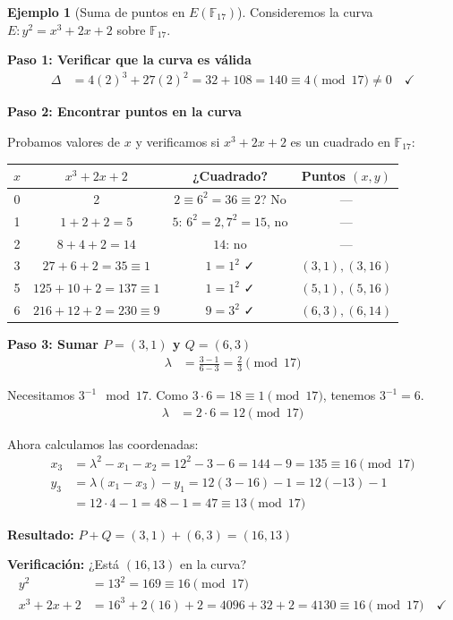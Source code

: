 \documentclass[11pt,a4paper,twoside,openright]{book}
\theoremstyle{definition}
\newtheorem{example}{Ejemplo}[chapter]
\theoremstyle{plain}
\theoremstyle{remark}
\begin{document}
\begin{example}[Suma de puntos en $E(\mathbb{F}_{17})$]
Consideremos la curva $E: y^2 = x^3 + 2x + 2$ sobre $\mathbb{F}_{17}$.

\textbf{Paso 1: Verificar que la curva es válida}
\begin{align}
\Delta &= 4(2)^3 + 27(2)^2 = 32 + 108 = 140 \equiv 4 \pmod{17} \neq 0 \quad \checkmark
\end{align}

\textbf{Paso 2: Encontrar puntos en la curva}

Probamos valores de $x$ y verificamos si $x^3 + 2x + 2$ es un cuadrado en $\mathbb{F}_{17}$:

\begin{center}
\begin{tabular}{c|c|c|c}
$x$ & $x^3 + 2x + 2$ & ¿Cuadrado? & Puntos $(x, y)$ \\
\hline
0 & 2 & $2 \equiv 6^2 = 36 \equiv 2$? No & --- \\
1 & $1 + 2 + 2 = 5$ & $5$: $6^2 = 2, 7^2 = 15$, no & --- \\
2 & $8 + 4 + 2 = 14$ & $14$: no & --- \\
3 & $27 + 6 + 2 = 35 \equiv 1$ & $1 = 1^2$ ✓ & $(3, 1), (3, 16)$ \\
5 & $125 + 10 + 2 = 137 \equiv 1$ & $1 = 1^2$ ✓ & $(5, 1), (5, 16)$ \\
6 & $216 + 12 + 2 = 230 \equiv 9$ & $9 = 3^2$ ✓ & $(6, 3), (6, 14)$ \\
\end{tabular}
\end{center}

\textbf{Paso 3: Sumar $P = (3, 1)$ y $Q = (6, 3)$}
\begin{align}
\lambda &= \frac{3 - 1}{6 - 3} = \frac{2}{3} \pmod{17}
\end{align}

Necesitamos $3^{-1} \mod 17$. Como $3 \cdot 6 = 18 \equiv 1 \pmod{17}$, tenemos $3^{-1} = 6$.
\begin{align}
\lambda &= 2 \cdot 6 = 12 \pmod{17}
\end{align}

Ahora calculamos las coordenadas:
\begin{align}
x_3 &= \lambda^2 - x_1 - x_2 = 12^2 - 3 - 6 = 144 - 9 = 135 \equiv 16 \pmod{17} \\
y_3 &= \lambda(x_1 - x_3) - y_1 = 12(3 - 16) - 1 = 12(-13) - 1 \\
    &= 12 \cdot 4 - 1 = 48 - 1 = 47 \equiv 13 \pmod{17}
\end{align}

\textbf{Resultado:} $P + Q = (3, 1) + (6, 3) = (16, 13)$

\textbf{Verificación:} ¿Está $(16, 13)$ en la curva?
\begin{align}
y^2 &= 13^2 = 169 \equiv 16 \pmod{17} \\
x^3 + 2x + 2 &= 16^3 + 2(16) + 2 = 4096 + 32 + 2 = 4130 \equiv 16 \pmod{17} \quad \checkmark
\end{align}
\end{example}
\end{document}
